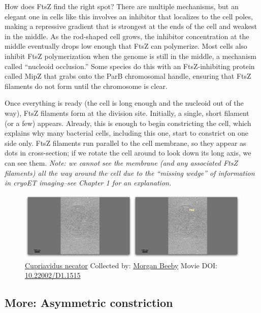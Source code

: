 \documentclass[]{tufte-book}
\begin{document}
How does FtsZ find the right spot? There are multiple mechanisms, but an
elegant one in cells like this involves an inhibitor that localizes to
the cell poles, making a repressive gradient that is strongest at the
ends of the cell and weakest in the middle. As the rod-shaped cell
grows, the inhibitor concentration at the middle eventually drops low
enough that FtsZ can polymerize. Most cells also inhibit FtsZ
polymerization when the genome is still in the middle, a mechanism
called ``nucleoid occlusion.'' Some species do this with an
FtsZ-inhibiting protein called MipZ that grabs onto the ParB chromosomal
handle, ensuring that FtsZ filaments do not form until the chromosome is
clear.

Once everything is ready (the cell is long enough and the nucleoid out
of the way), FtsZ filaments form at the division site. Initially, a
single, short filament (or a few) appears. Already, this is enough to
begin constricting the cell, which explains why many bacterial cells,
including this one, start to constrict on one side only. FtsZ filaments
run parallel to the cell membrane, so they appear as dots in
cross-section; if we rotate the cell around to look down its long axis,
we can see them. \emph{Note: we cannot see the membrane (and any
associated FtsZ filaments) all the way around the cell due to the
``missing wedge'' of information in cryoET imaging--see Chapter 1 for an
explanation.}





\begin{figure}
\includegraphics{movie_stills/5_9} \caption[\protect\hyperlink{tree}{Cupriavidus necator} Collected by:
\protect\hyperlink{morgan_beeby}{Morgan Beeby} Movie DOI:
\href{https://doi.org/10.22002/D1.1515}{10.22002/D1.1515}]{\protect\hyperlink{tree}{Cupriavidus necator} Collected by:
\protect\hyperlink{morgan_beeby}{Morgan Beeby} Movie DOI:
\href{https://doi.org/10.22002/D1.1515}{10.22002/D1.1515}}\label{fig:5-9}
\end{figure}

\hypertarget{Asymmetric_constriction}{\subsection*{More: Asymmetric
constriction}\label{Asymmetric_constriction}}
\end{document}
